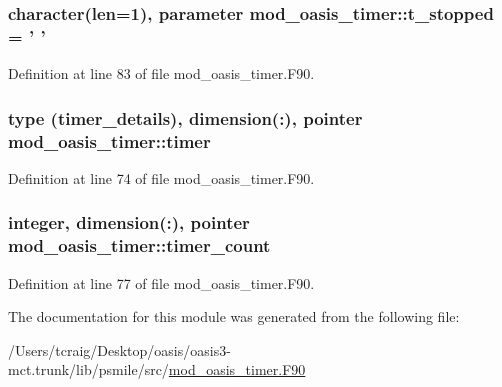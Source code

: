 \hypertarget{classmod__oasis__timer_aceca66a08f073eb12f2643edc7c400fe}{
\subsubsection[{t\+\_\+stopped}]{\setlength{\rightskip}{0pt plus 5cm}character(len=1), parameter mod\+\_\+oasis\+\_\+timer\+::t\+\_\+stopped = ' '\hspace{0.3cm}{\ttfamily [private]}}}\label{classmod__oasis__timer_aceca66a08f073eb12f2643edc7c400fe}


Definition at line 83 of file mod\+\_\+oasis\+\_\+timer.\+F90.

\hypertarget{classmod__oasis__timer_a8a4b64983bdf68b795ab2112bc02b8bc}{
\subsubsection[{timer}]{\setlength{\rightskip}{0pt plus 5cm}type ({\bf timer\+\_\+details}), dimension(\+:), pointer mod\+\_\+oasis\+\_\+timer\+::timer\hspace{0.3cm}{\ttfamily [private]}}}\label{classmod__oasis__timer_a8a4b64983bdf68b795ab2112bc02b8bc}


Definition at line 74 of file mod\+\_\+oasis\+\_\+timer.\+F90.

\hypertarget{classmod__oasis__timer_a225db1b2b8bd57f0567d37b5c4d00ca3}{
\subsubsection[{timer\+\_\+count}]{\setlength{\rightskip}{0pt plus 5cm}integer, dimension(\+:), pointer mod\+\_\+oasis\+\_\+timer\+::timer\+\_\+count\hspace{0.3cm}{\ttfamily [private]}}}\label{classmod__oasis__timer_a225db1b2b8bd57f0567d37b5c4d00ca3}


Definition at line 77 of file mod\+\_\+oasis\+\_\+timer.\+F90.



The documentation for this module was generated from the following file\+:\begin{DoxyCompactItemize}
\item 
/\+Users/tcraig/\+Desktop/oasis/oasis3-\/mct.\+trunk/lib/psmile/src/\hyperlink{mod__oasis__timer_8_f90}{mod\+\_\+oasis\+\_\+timer.\+F90}\end{DoxyCompactItemize}
